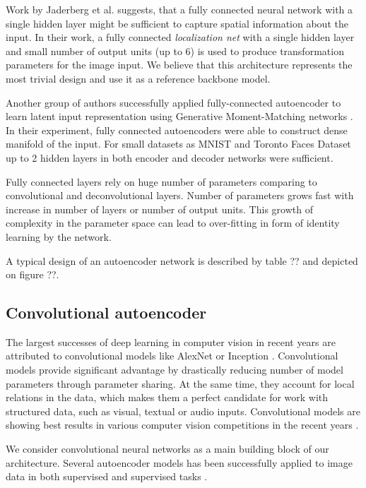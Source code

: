 Work by Jaderberg et al. \cite{Jaderberg2015} suggests, that a fully connected neural network with a single hidden layer might be sufficient to capture spatial information about the input.
In their work, a fully connected \textit{localization net} with a single hidden layer and small number of output units (up to 6) is used to produce transformation parameters for the image input.
We believe that this architecture represents the most trivial design and use it as a reference backbone model.

Another group of authors successfully applied fully-connected autoencoder to learn latent input representation using Generative Moment-Matching networks \cite{Li2015}.
In their experiment, fully connected autoencoders were able to construct dense manifold of the input.
For small datasets as MNIST and Toronto Faces Dataset \cite{tfd,lecun-mnisthandwrittendigit-2010} up to 2 hidden layers in both encoder and decoder networks were sufficient.

Fully connected layers rely on huge number of parameters comparing to convolutional and deconvolutional layers.
Number of parameters grows fast with increase in number of layers or number of output units.
This growth of complexity in the parameter space can lead to over-fitting in form of identity learning by the network.

A typical design of an autoencoder network is described by table ?? and depicted on figure ??.

\subsection{Convolutional autoencoder}

The largest successes of deep learning in computer vision in recent years are attributed to convolutional models like AlexNet or Inception \cite{Krizhevsky2012, Szegedy2016}.
Convolutional models provide significant advantage by drastically reducing number of model parameters through parameter sharing.
At the same time, they account for local relations in the data, which makes them a perfect candidate for work with structured data, such as visual, textual or audio inputs.
Convolutional models are showing best results in various computer vision competitions in the recent years \cite{ILSVRC15, Zhou2016}.

We consider convolutional neural networks as a main building block of our architecture.
Several autoencoder models has been successfully applied to image data in both supervised and supervised tasks \cite{Rifai2011, Vincent2010, Masci2011, Goodfellow2014, Kulkarni2015}.

